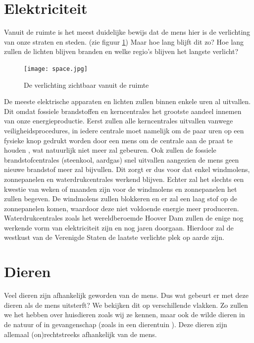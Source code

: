 \section{Elektriciteit}
Vanuit de ruimte is het meest duidelijke bewijs dat de mens hier is de verlichting van onze straten en steden. (zie figuur \ref{fig:space}) \cite{lightsSpace} Maar hoe lang blijft dit zo? Hoe lang zullen de lichten blijven branden en welke regio's blijven het langste verlicht?\newpage
\begin{figure}
	\centering
	\texttt{[image: space.jpg]}
	\caption{De verlichting zichtbaar vanuit de ruimte}
	\label{fig:space}
\end{figure}
De meeste elektrische apparaten en lichten zullen binnen enkele uren al uitvallen. Dit omdat fossiele brandstoffen en kerncentrales het grootste aandeel innemen van onze energieproductie. \cite{energySources} Eerst zullen alle kerncentrales uitvallen vanwege veiligheidsprocedures, in iedere centrale moet namelijk om de paar uren op een fysieke knop gedrukt worden door een mens om de centrale aan de praat te houden \cite{standaard}, wat natuurlijk niet meer zal gebeuren. Ook zullen de fossiele brandstofcentrales (steenkool, aardgas) snel uitvallen aangezien de mens geen nieuwe brandstof meer zal bijvullen. \cite{standaard} Dit zorgt er dus voor dat enkel windmolens, zonnepanelen en waterdrukcentrales werkend blijven.\newline\newline
Echter zal het slechts een kwestie van weken of maanden zijn voor de windmolens en zonnepanelen het zullen begeven. De windmolens zullen blokkeren en er zal een laag stof op de zonnepanelen komen, waardoor deze niet voldoende energie meer produceren. \cite{standaard} Waterdrukcentrales zoals het wereldberoemde Hoover Dam zullen de enige nog werkende vorm van elektriciteit zijn en nog jaren doorgaan. Hierdoor zal de westkust van de Verenigde Staten de laatste verlichte plek op aarde zijn. \cite{hoover}
\section{Dieren}
Veel dieren zijn afhankelijk geworden van de mens. Dus wat gebeurt er met deze dieren als de mens uitsterft? We bekijken dit op verschillende vlakken. Zo zullen we het hebben over huisdieren zoals wij ze kennen, maar ook de wilde dieren in de natuur of in gevangenschap (zoals in een dierentuin ). Deze dieren zijn allemaal (on)rechtstreeks afhankelijk van de mens.  \cite{ASAPScience,LAPOutbreak}

